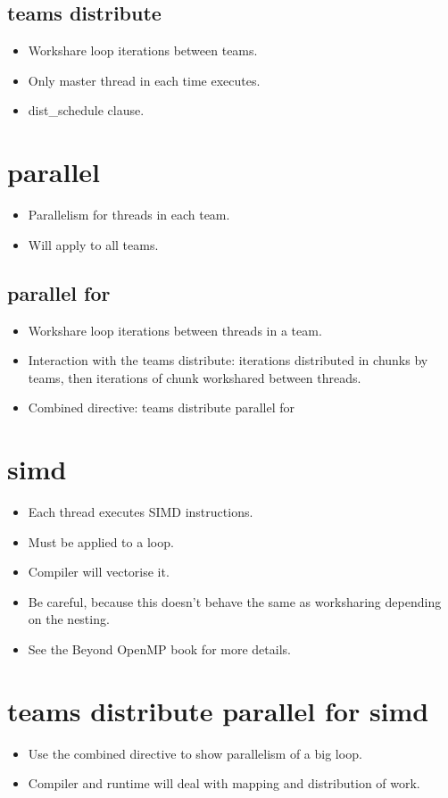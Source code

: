 \subsection{teams distribute}
\begin{itemize}
  \item Workshare loop iterations between teams.
  \item Only master thread in each time executes.
  \item dist\_schedule clause.
\end{itemize}

\section{parallel}
\begin{itemize}
  \item Parallelism for threads in each team.
  \item Will apply to all teams.
\end{itemize}

\subsection{parallel for}
\begin{itemize}
  \item Workshare loop iterations between threads in a team.
  \item Interaction with the teams distribute: iterations distributed in chunks by teams, then iterations of chunk workshared between threads.
  \item Combined directive: teams distribute parallel for
\end{itemize}

\section{simd}
\begin{itemize}
  \item Each thread executes SIMD instructions.
  \item Must be applied to a loop.
  \item Compiler will vectorise it.
  \item Be careful, because this doesn't behave the same as worksharing depending on the nesting.
  \item See the Beyond OpenMP book for more details.
\end{itemize}

\section{teams distribute parallel for simd}
\begin{itemize}
  \item Use the combined directive to show parallelism of a big loop.
  \item Compiler and runtime will deal with mapping and distribution of work.
\end{itemize}


